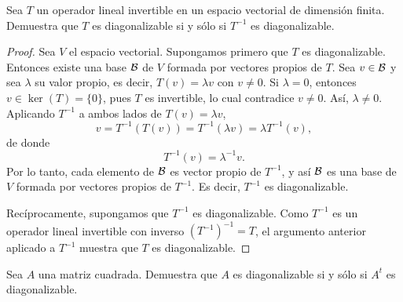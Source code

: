 \documentclass[12pt,a4paper]{article}
\begin{document}
    \begin{problema}
        Sea $T$ un operador lineal invertible en un espacio vectorial de dimensión finita. Demuestra que $T$ es diagonalizable si y sólo si $T^{-1}$ es diagonalizable.
    \end{problema}

    \begin{proof}
        Sea $V$ el espacio vectorial. Supongamos primero que $T$ es diagonalizable. Entonces existe una base $\mathcal{B}$ de $V$ formada por vectores propios de $T$. Sea $v\in\mathcal{B}$ y sea $\lambda$ su valor propio, es decir, $T(v)=\lambda v$ con $v\neq0$. Si $\lambda=0$, entonces $v\in \ker(T)=\{0\}$, pues $T$ es invertible, lo cual contradice $v\neq0$. Así, $\lambda\neq0$. Aplicando $T^{-1}$ a ambos lados de $T(v)=\lambda v$,
        \begin{equation*}
            v=T^{-1}(T(v))=T^{-1}(\lambda v)=\lambda T^{-1}(v),
        \end{equation*}
        de donde
        \begin{equation*}
            T^{-1}(v)=\lambda^{-1}v.
        \end{equation*}
        Por lo tanto, cada elemento de $\mathcal{B}$ es vector propio de $T^{-1}$, y así $\mathcal{B}$ es una base de $V$ formada por vectores propios de $T^{-1}$. Es decir, $T^{-1}$ es diagonalizable.

        Recíprocamente, supongamos que $T^{-1}$ es diagonalizable. Como $T^{-1}$ es un operador lineal invertible con inverso $(T^{-1})^{-1}=T$, el argumento anterior aplicado a $T^{-1}$ muestra que $T$ es diagonalizable.
    \end{proof}

    \begin{problema}
        Sea $A$ una matriz cuadrada. Demuestra que $A$ es diagonalizable si y sólo si $A^{t}$ es diagonalizable.
    \end{problema}
\end{document}
